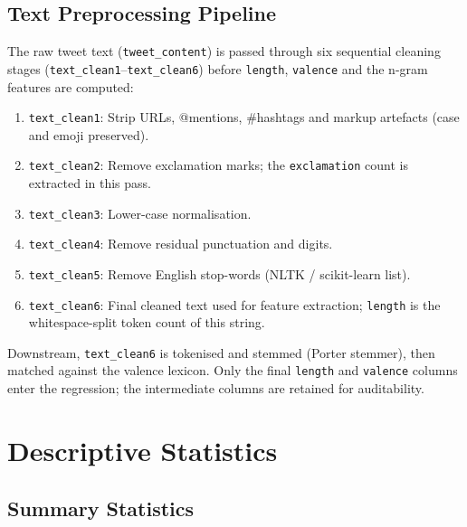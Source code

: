 \documentclass[12pt,a4paper]{article}
\begin{document}
\subsection{Text Preprocessing Pipeline}
\label{sec:preproc}

The raw tweet text (\texttt{tweet\_content}) is passed through six sequential cleaning stages (\texttt{text\_clean1}--\texttt{text\_clean6}) before \texttt{length}, \texttt{valence} and the n-gram features are computed:

\begin{enumerate}
    \item \texttt{text\_clean1}: Strip URLs, @mentions, \#hashtags and markup artefacts (case and emoji preserved).
    \item \texttt{text\_clean2}: Remove exclamation marks; the \texttt{exclamation} count is extracted in this pass.
    \item \texttt{text\_clean3}: Lower-case normalisation.
    \item \texttt{text\_clean4}: Remove residual punctuation and digits.
    \item \texttt{text\_clean5}: Remove English stop-words (NLTK / scikit-learn list).
    \item \texttt{text\_clean6}: Final cleaned text used for feature extraction; \texttt{length} is the whitespace-split token count of this string.
\end{enumerate}

Downstream, \texttt{text\_clean6} is tokenised and stemmed (Porter stemmer), then matched against the valence lexicon. Only the final \texttt{length} and \texttt{valence} columns enter the regression; the intermediate columns are retained for auditability.

\newpage

\section{Descriptive Statistics}

\subsection{Summary Statistics}
\end{document}
